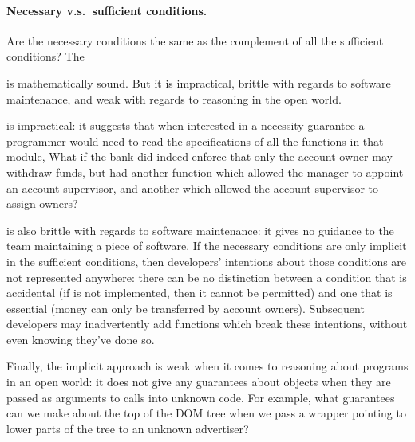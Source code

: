


\paragraph{Necessary v.s.\ sufficient conditions.}

Are the necessary conditions the same as the complement of all the
sufficient conditions?  The 

 is mathematically sound. But it is impractical, brittle with
regards to software maintenance, and weak with regards to reasoning in
the open world.


 is impractical: it suggests that when interested in
a necessity guarantee a programmer would need to read the
specifications of all the functions in that module, 
What if the bank did indeed enforce that only the account owner may withdraw
funds, but had another function which allowed the manager to appoint
an account supervisor, and another which allowed the account
supervisor to assign owners?

 is also brittle with regards to software maintenance:
 it gives no guidance to the team maintaining a piece of
software.  If the necessary conditions are only implicit in the
sufficient conditions, then developers' intentions about those
conditions are not represented anywhere: there can be no distinction
between a condition that is accidental (if  is not
implemented, then it cannot be permitted) and one that is essential
(money can only be transferred by account owners).
Subsequent developers may inadvertently add functions which break these
intentions, without even knowing they've done so.

Finally, the implicit approach  is   weak when it comes to reasoning
about programs in an open world:  it does not give any
guarantees about objects when they are passed as arguments to calls
into unknown code. For example, what guarantees can we make about the
top of the DOM tree when we pass a wrapper pointing to lower parts of
the tree to an unknown advertiser?
